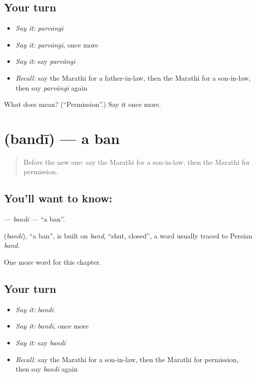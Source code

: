 \subsection*{Your turn}
\begin{itemize}
\raggedright
  \item \emph{Say it:} \emph{parvāngī}
  \item \emph{Say it:} \emph{parvāngī}, once more
  \item \emph{Say it:} say \emph{parvāngī}
  \item \emph{Recall:} say the Marathi for a father-in-law, then the Marathi for a son-in-law, then say \emph{parvāngī} again
\end{itemize}

\begin{tcolorbox}[breakable,colback=teal!4,colframe=teal!35!black,title={Before you move on}]
What does  mean? (\textquotedblleft{}Permission\textquotedblright{}.) Say it once more.
\end{tcolorbox}
\section[\texorpdfstring{\mr{बंदी} (bandī)}{बंदी (bandī)}]{ (bandī) — a ban}

\label{lesson:MR-C265-bandi}



\begin{quote}
Before the new one: say the Marathi for a son-in-law, then the Marathi for permission.
\end{quote}

\subsection*{You'll want to know: }
\textbf{} — \emph{bandī} — \textquotedblleft{}a ban\textquotedblright{}.

\begin{cousinweb}
\textbf{} (\emph{bandī}), \textquotedblleft{}a ban\textquotedblright{}, is built on \emph{band}, \textquotedblleft{}shut, closed\textquotedblright{}, a word usually traced to Persian \emph{band}.
\end{cousinweb}

\begin{grammarlens}[title={What you've built}]
One more word for this chapter.
\end{grammarlens}

\subsection*{Your turn}
\begin{itemize}
\raggedright
  \item \emph{Say it:} \emph{bandī}
  \item \emph{Say it:} \emph{bandī}, once more
  \item \emph{Say it:} say \emph{bandī}
  \item \emph{Recall:} say the Marathi for a son-in-law, then the Marathi for permission, then say \emph{bandī} again
\end{itemize}

